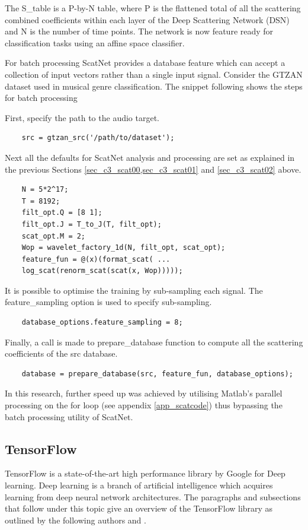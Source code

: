 The S\_table is a P-by-N table, where P is the flattened total of all the scattering combined coefficients within each layer of the Deep Scattering Network (DSN) and N is the number of time points. The network is now feature ready for classification tasks using an affine space classifier.

For batch processing ScatNet provides a database feature which can accept a collection of input vectors rather than a single input signal.  Consider the GTZAN dataset used in musical genre classification.  The snippet following shows the steps for batch processing

First, specify the path to the audio target.
\begin{verbatim}
    src = gtzan_src('/path/to/dataset');
\end{verbatim}

Next all the defaults for ScatNet analysis and processing are set as explained in the previous Sections \ref{sec_c3_scat00,sec_c3_scat01} and \ref{sec_c3_scat02} above.
\begin{verbatim}
    N = 5*2^17;
    T = 8192;
    filt_opt.Q = [8 1];
    filt_opt.J = T_to_J(T, filt_opt);
    scat_opt.M = 2;
    Wop = wavelet_factory_1d(N, filt_opt, scat_opt);
    feature_fun = @(x)(format_scat( ...
    log_scat(renorm_scat(scat(x, Wop)))));
\end{verbatim}

It is possible to optimise the training by sub-sampling each signal.  The feature\_sampling option is used to specify sub-sampling.
\begin{verbatim}
    database_options.feature_sampling = 8;
\end{verbatim}


Finally, a call is made to prepare\_database function to compute all the scattering coefficients of the src database.
\begin{verbatim}
    database = prepare_database(src, feature_fun, database_options);
\end{verbatim}

In this research, further speed up was achieved by utilising Matlab’s parallel processing on the for loop (see appendix \ref{app_scatcode}) thus bypassing the batch processing utility of ScatNet.

\subsection{TensorFlow}\label{sec_c3_tf}
TensorFlow is a state-of-the-art high performance library by Google for Deep learning.  Deep learning is a branch of artificial intelligence which acquires learning from deep neural network architectures.  The paragraphs and subsections that follow under this topic give an overview of the TensorFlow library as outlined by the following authors \cite{goldsborough2016tour,abadi2016tensorflow} and \cite{abadi2017computational}.

